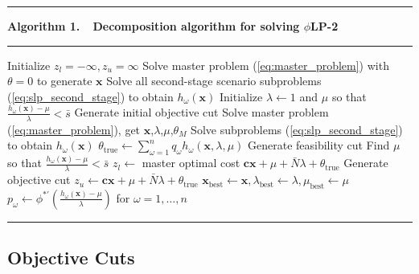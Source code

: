 \documentclass[12pt]{article}
\newcommand{\x}{\mathbf{x}}
\renewcommand{\c}{\mathbf{c}}
\theoremstyle{plain}
\theoremstyle{definition}
\theoremstyle{remark}
\newcommand{\plp}{$\phi$LP-2}
\begin{document}
\begin{center}
\begin{minipage}{.61\textwidth}
	\TableSpaced
	\hrule
	\vspace{1pt}
    {\bf \small Algorithm 1.\ \ Decomposition algorithm for solving \plp}
	\hrule
	\vspace{1pt}
	\begin{algorithmic}
		\State Initialize $z_l = -\infty, z_u = \infty$
		\State Solve master problem (\ref{eq:master_problem}) with $\theta = 0$ to generate $\x$
		\State Solve all second-stage scenario subproblems (\ref{eq:slp_second_stage}) to obtain $h_\omega(\x)$
		\State Initialize $\lambda \gets 1$ and $\mu$ so that $\frac{h_\omega(\x) - \mu}{\lambda} < \bar{s}$
		\State Generate initial objective cut
			\State Solve master problem (\ref{eq:master_problem}), get $\x$,$\lambda$,$\mu$,$\theta_M$
			\State Solve subproblems (\ref{eq:slp_second_stage}) to obtain  $h_\omega(\x)$
			\State $\theta_{\text{true}} \gets \sum_{\omega=1}^n q_\omega h_\omega(\x,\lambda,\mu)$
			\If{$\frac{h_\omega(\x) - \mu}{\lambda} > \bar{s}$}
				\State Generate feasibility cut
				\State Find $\mu$ so that $\frac{h_\omega(\x) - \mu}{\lambda} < \bar{s}$
			\Else
				\State $z_l \gets$ master optimal cost $\c\x + \mu + \bar{N}\lambda + \theta_{\text{true}}$
			\EndIf
			\State Generate objective cut
			\If{$\c\x + \mu + \bar{N}\lambda + \theta_{\text{true}} < z_u$}
				\State $z_u \gets \c\x + \mu + \bar{N}\lambda + \theta_{\text{true}}$
				\State $\x_\text{best} \gets \x, \lambda_\text{best} \gets \lambda, \mu_\text{best} \gets \mu$
				\State $p_\omega \gets \phi^{*\prime}(\tfrac{h_\omega(\x) - \mu}{\lambda})$ for $\omega = 1, \dots, n$
			\EndIf
		\EndWhile
	\end{algorithmic}
	\hrule
\end{minipage}
\end{center}


\subsection{Objective Cuts}
\end{document}
